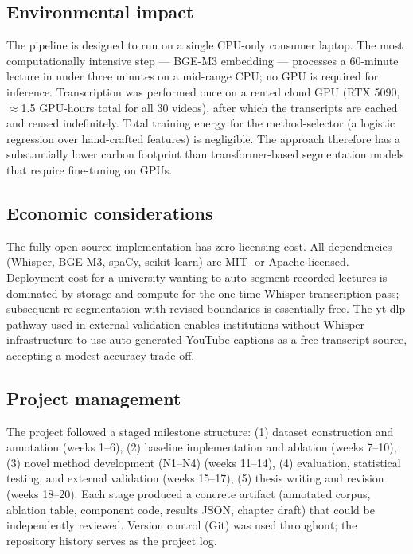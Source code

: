 \subsection*{Environmental impact}

The pipeline is designed to run on a single CPU-only consumer laptop.
The most computationally intensive step --- BGE-M3 embedding --- processes
a 60-minute lecture in under three minutes on a mid-range CPU; no GPU is
required for inference.
Transcription was performed once on a rented cloud GPU (RTX 5090, $\approx$1.5
GPU-hours total for all 30 videos), after which the transcripts are cached and
reused indefinitely.
Total training energy for the method-selector (a logistic regression over
hand-crafted features) is negligible.
The approach therefore has a substantially lower carbon footprint than
transformer-based segmentation models that require fine-tuning on GPUs.

\subsection*{Economic considerations}

The fully open-source implementation has zero licensing cost.
All dependencies (Whisper, BGE-M3, spaCy, scikit-learn) are MIT- or
Apache-licensed.
Deployment cost for a university wanting to auto-segment recorded lectures is
dominated by storage and compute for the one-time Whisper transcription pass;
subsequent re-segmentation with revised boundaries is essentially free.
The yt-dlp pathway used in external validation enables institutions without
Whisper infrastructure to use auto-generated YouTube captions as a free
transcript source, accepting a modest accuracy trade-off.

\subsection*{Project management}

The project followed a staged milestone structure:
(1) dataset construction and annotation (weeks 1--6),
(2) baseline implementation and ablation (weeks 7--10),
(3) novel method development (N1--N4) (weeks 11--14),
(4) evaluation, statistical testing, and external validation (weeks 15--17),
(5) thesis writing and revision (weeks 18--20).
Each stage produced a concrete artifact (annotated corpus, ablation table,
component code, results JSON, chapter draft) that could be independently
reviewed.
Version control (Git) was used throughout; the repository history serves as
the project log.

